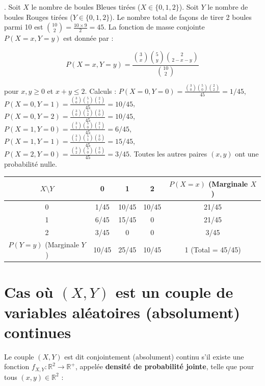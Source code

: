 \begin{exemple}. Soit $X$ le nombre de boules Bleues tirées ($X \in \{0, 1, 2\}$). Soit $Y$ le nombre de boules Rouges tirées ($Y \in \{0, 1, 2\}$). Le nombre total de façons de tirer 2 boules parmi 10 est $\binom{10}{2} = \frac{10 \times 9}{2} = 45$. La fonction de masse conjointe $P(X=x, Y=y)$ est donnée par :

\[
P(X=x, Y=y) = \frac{\binom{3}{x} \binom{5}{y} \binom{2}{2-x-y}}{\binom{10}{2}}
\]

pour $x, y \geq 0$ et $x+y \leq 2$. Calculs : $P(X=0, Y=0) = \frac{\binom{3}{0}\binom{5}{0}\binom{2}{2}}{45} = 1/45$, $P(X=0, Y=1) = \frac{\binom{3}{0}\binom{5}{1}\binom{2}{1}}{45} = 10/45$, $P(X=0, Y=2) = \frac{\binom{3}{0}\binom{5}{2}\binom{2}{0}}{45} = 10/45$, $P(X=1, Y=0) = \frac{\binom{3}{1}\binom{5}{0}\binom{2}{1}}{45} = 6/45$, $P(X=1, Y=1) = \frac{\binom{3}{1}\binom{5}{1}\binom{2}{0}}{45} = 15/45$, $P(X=2, Y=0) = \frac{\binom{3}{2}\binom{5}{0}\binom{2}{0}}{45} = 3/45$. Toutes les autres paires $(x,y)$ ont une probabilité nulle.

\begin{center}
\renewcommand{\arraystretch}{1.5}
\begin{tabular}{c|ccc|c}
$X \setminus Y$ & 0 & 1 & 2 & $P(X=x)$ (Marginale $X$) \\ \hline
0 & 1/45 & 10/45 & 10/45 & 21/45 \\
1 & 6/45 & 15/45 & 0 & 21/45 \\
2 & 3/45 & 0 & 0 & 3/45 \\ \hline
$P(Y=y)$ (Marginale $Y$) & 10/45 & 25/45 & 10/45 & 1 (Total = 45/45)
\end{tabular}
\end{center}
    
\end{exemple}
\vspace{2em}
    

\section{Cas où $(X, Y)$ est un couple de variables aléatoires (absolument) continues}

Le couple $(X, Y)$ est dit conjointement (absolument) continu s'il existe une fonction $f_{X,Y} : \mathbb{R}^2 \to \mathbb{R}^+$, appelée \textbf{densité de probabilité jointe}, telle que pour tous $(x, y) \in \mathbb{R}^2$ :

